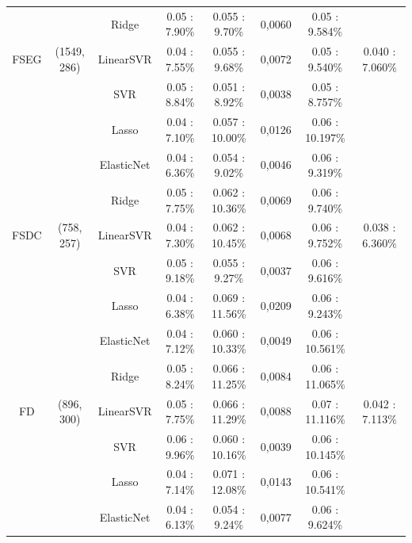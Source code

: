 \begin{table}
{{\begin{tabular}{|c|c|c|c|c|c|c|c|}
		&              &       Ridge &   0.05 : 7.90\% &   0.055  : 9.70\% &       0,0060 &   0.05 : 9.584\% &                 \\ \cline{3-8}
		FSEG &  (1549, 286) &   LinearSVR &   0.04 : 7.55\% &   0.055  : 9.68\% &       0,0072 &   0.05 : 9.540\% &  0.040 : 7.060\% \\ \cline{3-8}
		&              &         SVR &   0.05 : 8.84\% &   0.051  : 8.92\% &       0,0038 &   0.05 : 8.757\% &                 \\ \cline{3-8}
		&              &       Lasso &   0.04 : 7.10\% &  0.057  : 10.00\% &       0,0126 &  0.06 : 10.197\% &                 \\ \cline{1-8}
		&              &  ElasticNet &   0.04 : 6.36\% &   0.054  : 9.02\% &       0,0046 &   0.06 : 9.319\% &                 \\ \cline{3-8}
		&              &       Ridge &   0.05 : 7.75\% &  0.062  : 10.36\% &       0,0069 &   0.06 : 9.740\% &                 \\ \cline{3-8}
		FSDC &   (758, 257) &   LinearSVR &   0.04 : 7.30\% &  0.062  : 10.45\% &       0,0068 &   0.06 : 9.752\% &  0.038 : 6.360\% \\ \cline{3-8}
		&              &         SVR &   0.05 : 9.18\% &   0.055  : 9.27\% &       0,0037 &   0.06 : 9.616\% &                 \\ \cline{3-8}
		&              &       Lasso &   0.04 : 6.38\% &  0.069  : 11.56\% &       0,0209 &   0.06 : 9.243\% &                 \\ \cline{1-8}
		&              &  ElasticNet &   0.04 : 7.12\% &  0.060  : 10.33\% &       0,0049 &  0.06 : 10.561\% &                 \\ \cline{3-8}
		&              &       Ridge &   0.05 : 8.24\% &  0.066  : 11.25\% &       0,0084 &  0.06 : 11.065\% &                 \\ \cline{3-8}
		FD &   (896, 300) &   LinearSVR &   0.05 : 7.75\% &  0.066  : 11.29\% &       0,0088 &  0.07 : 11.116\% &  0.042 : 7.113\% \\ \cline{3-8}
		&              &         SVR &   0.06 : 9.96\% &  0.060  : 10.16\% &       0,0039 &  0.06 : 10.145\% &                 \\ \cline{3-8}
		&              &       Lasso &   0.04 : 7.14\% &  0.071  : 12.08\% &       0,0143 &  0.06 : 10.541\% &                 \\ \cline{1-8}
		&              &  ElasticNet &   0.04 : 6.13\% &   0.054  : 9.24\% &       0,0077 &   0.06 : 9.624\% &                 \\ \cline{3-8}

\end{tabular}}}
\end{table}
